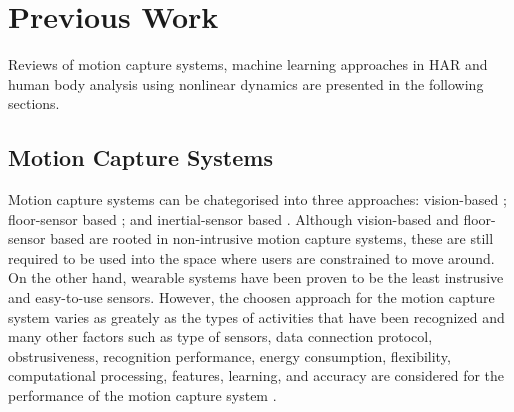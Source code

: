 \documentclass{sigchi}
\begin{document}
\section{Previous Work}

Reviews of motion capture systems, 
machine learning approaches in HAR and human body analysis using 
nonlinear dynamics are presented in the following sections.


\subsection{Motion Capture Systems}
Motion capture systems can be chategorised into three approaches: 
vision-based \cite{Forsyth2005}; 
floor-sensor based
\cite{Paradiso1997,Steinhage2008,Aguilar2007,Wimmer2011,Yin2003,Moere2004,
Richardson2004,Srinivasan2005, Rangarajan2008,Visell2010, Rajalingham2010}
; and inertial-sensor based
\cite{Razak2012,Bamberg2008,Benocci2009,Xu2012,Holleczek2010}.
Although vision-based and floor-sensor based are rooted in non-intrusive 
motion capture systems, these are still required to be used into the space 
where users are constrained to move around.
On the other hand, wearable systems have been proven to be the least instrusive 
and easy-to-use sensors. However, the choosen approach for 
the motion capture system varies as greately as the 
types of activities that have been recognized 
and many other factors such as type of sensors, data connection protocol, obstrusiveness, 
recognition performance, energy consumption, flexibility, computational processing,
features, learning, and accuracy 
are considered for the performance of the motion capture system \cite{Lara2013}.
\end{document}
